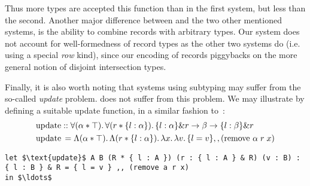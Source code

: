 Thus more types are accepted this function than in the first system, but less than the second. 
Another major difference between \name and the two other mentioned systems, is the ability to 
combine records with arbitrary types.
Our system does not account for well-formedness of record types as the other two systems do 
(i.e. using a special \emph{row} kind), since our encoding of records piggybacks on the more
general notion of disjoint intersection types. 

Finally, it is also worth noting that systems using subtyping may suffer from the so-called 
\emph{update} problem.
\name does not suffer from this problem. 
We may illustrate by defining a suitable update function, in a similar fashion 
to~\cite{leijen2005extensible}:
\begin{align*}
&\text{update} :: \forall (\alpha * \top).\, \forall (r * \{ l : \alpha \}).\, {\{ l : \alpha \} \& r \rightarrow \beta \rightarrow \{ l : \beta \} \& r} \\ 
&\text{update} \, = \Lambda (\alpha * \top).\, \Lambda (r * \{ l : \alpha \}).\, \lambda x.\, \lambda v.\, 
\{ l = v \} ,, (\text{remove } \alpha \; r \; x) 
\end{align*}
\begin{lstlisting}[mathescape=true]
let $\text{update}$ A B (R * { l : A }) (r : { l : A } & R) (v : B) : { l : B } & R = { l = v } ,, (remove a r x) 
in $\ldots$ 
\end{lstlisting}



